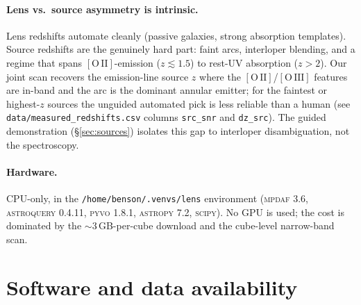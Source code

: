 \documentclass[11pt,letterpaper]{article}
\newcommand{\mpdaf}{\textsc{mpdaf}}
\newcommand{\OII}{\ensuremath{[\mathrm{O\,II}]}}
\newcommand{\OIII}{\ensuremath{[\mathrm{O\,III}]}}
\begin{document}
\paragraph{Lens vs.\ source asymmetry is intrinsic.} Lens redshifts automate
cleanly (passive galaxies, strong absorption templates). Source redshifts are
the genuinely hard part: faint arcs, interloper blending, and a regime that
spans \OII-emission ($z \lesssim 1.5$) to rest-UV absorption ($z > 2$). Our
joint scan recovers the emission-line source $z$ where the \OII/\OIII{} features
are in-band and the arc is the dominant annular emitter; for the faintest or
highest-$z$ sources the unguided automated pick is less reliable than a human
(see \texttt{data/measured\_redshifts.csv} columns \texttt{src\_snr} and
\texttt{dz\_src}). The guided demonstration (\S\ref{sec:sources}) isolates this
gap to interloper disambiguation, not the spectroscopy.

\paragraph{Hardware.} CPU-only, in the \texttt{/home/benson/.venvs/lens}
environment (\mpdaf{} 3.6, \textsc{astroquery} 0.4.11, \textsc{pyvo} 1.8.1,
\textsc{astropy} 7.2, \textsc{scipy}). No GPU is used; the cost is dominated by
the $\sim$3\,GB-per-cube download and the cube-level narrow-band scan.

\section{Software and data availability}
\end{document}
